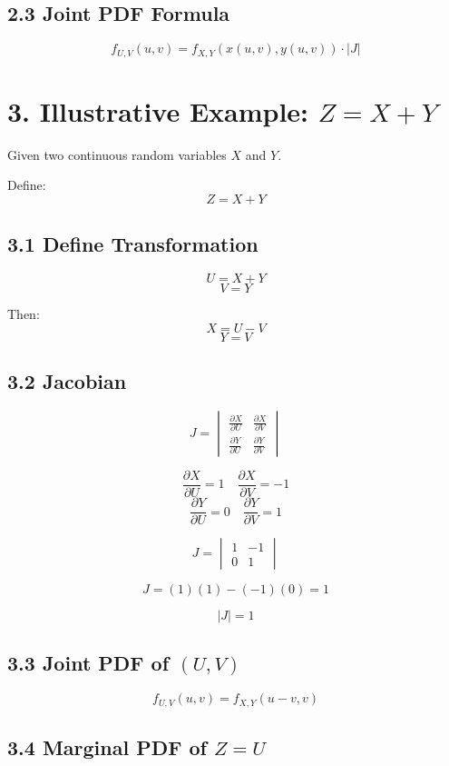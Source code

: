 \documentclass[12pt]{article}
\begin{document}
\subsection*{2.3 Joint PDF Formula}

\[
\boxed{
f_{U,V}(u,v)
=
f_{X,Y}(x(u,v), y(u,v))
\cdot
|J|
}
\]

\section*{3. Illustrative Example: $Z = X + Y$}

Given two continuous random variables $X$ and $Y$.

Define:
\[
Z = X + Y
\]

\subsection*{3.1 Define Transformation}

\[
U = X + Y
\]
\[
V = Y
\]

Then:
\[
X = U - V
\]
\[
Y = V
\]

\subsection*{3.2 Jacobian}

\[
J =
\begin{vmatrix}
\frac{\partial X}{\partial U} & \frac{\partial X}{\partial V} \\
\frac{\partial Y}{\partial U} & \frac{\partial Y}{\partial V}
\end{vmatrix}
\]

\[
\frac{\partial X}{\partial U} = 1
\quad
\frac{\partial X}{\partial V} = -1
\]
\[
\frac{\partial Y}{\partial U} = 0
\quad
\frac{\partial Y}{\partial V} = 1
\]

\[
J =
\begin{vmatrix}
1 & -1 \\
0 & 1
\end{vmatrix}
\]

\[
J = (1)(1) - (-1)(0) = 1
\]

\[
|J| = 1
\]

\subsection*{3.3 Joint PDF of $(U,V)$}

\[
f_{U,V}(u,v)
=
f_{X,Y}(u-v, v)
\]

\subsection*{3.4 Marginal PDF of $Z = U$}
\end{document}
